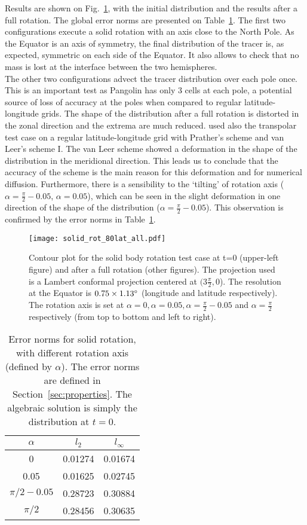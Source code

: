 Results are shown on Fig.~\ref{fig:solid_rot}, with the initial distribution and
the results after a full rotation. The global error norms are presented on
Table~\ref{tab:solid_rot}. The first two configurations execute a solid
rotation with an axis close to the North Pole. As the Equator is an axis of
symmetry, the final distribution of the tracer is, as expected, symmetric on
each side of the Equator. It also allows to check that no mass is lost at the
interface between the two hemispheres. \\
The other two configurations advect the tracer distribution over each pole once.
This is an important test as Pangolin has only 3 cells at each pole,
a potential source of loss of accuracy at the poles when compared to
regular latitude-longitude grids. The shape of the distribution after a full rotation
is distorted in the zonal direction and the extrema are much reduced.
\cite{Hourdin2005} used also the transpolar test case on a regular
latitude-longitude grid with Prather's scheme and van Leer's scheme I. The van
Leer scheme showed a deformation in the shape of the distribution in the
meridional direction. This leads us to conclude that the accuracy of the scheme
is the main reason for this deformation and for numerical diffusion.
Furthermore, there is a sensibility to the `tilting' of rotation axis
($\alpha=\frac{\pi}{2}-0.05$, $\alpha=0.05$), which can be seen in the slight
deformation in one direction of the shape of the distribution
($\alpha=\frac{\pi}{2}-0.05$). This observation is confirmed by the error norms
in Table~\ref{tab:solid_rot}.

\begin{figure}
  \centering
  \texttt{[image: solid\_rot\_80lat\_all.pdf]}
  \caption{Contour plot for the solid body rotation test case at t=0 (upper-left
    figure) and after a full rotation (other figures). The projection used is a
    Lambert conformal projection centered at $(3\frac{\pi}{2}, 0$). The
    resolution at the Equator is $0.75\times1.13^{\circ}$ (longitude and latitude
    respectively). The rotation axis is set at $\alpha=0, \alpha=0.05,
    \alpha=\frac{\pi}{2}-0.05$ and $\alpha=\frac{\pi}{2}$ respectively (from top
    to bottom and left to right).}
\label{fig:solid_rot}
\end{figure}

\begin{table}
  \centering
  \caption{Error norms for solid rotation, with different rotation axis (defined
    by $\alpha$). The error norms are defined in
    Section~\ref{sec:properties}. The algebraic solution is simply the
  distribution at $t=0$.}
\label{tab:solid_rot}
  \begin{tabular}{ccc}
    \toprule
    $\alpha$ & $l_2$ & $l_{\infty}$\\
    \midrule 
    0            & 0.01274 & 0.01674  \\
    0.05         & 0.01625 & 0.02745\\
    $\pi/2-0.05$ & 0.28723 & 0.30884\\
    $\pi/2$      & 0.28456 & 0.30635 \\
    \bottomrule
  \end{tabular}
\end{table}


